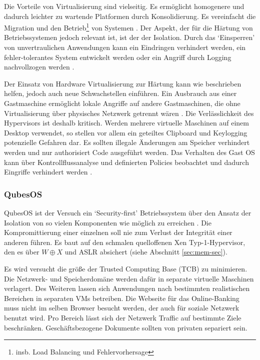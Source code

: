 Die Vorteile von Virtualisierung sind vielseitig. Es ermöglicht homogenere und dadurch leichter zu wartende Platformen durch Konsolidierung. Es vereinfacht die Migration und den Betrieb\footnote{insb. Load Balancing und Fehlervorhersage} von Systemen \cite{uhlig-intel}. Der Aspekt, der für die Härtung von Betriebssystemen jedoch relevant ist, ist der der Isolation. Durch das `Einsperren' von unvertraulichen Anwendungen kann ein Eindringen verhindert werden, ein fehler-tolerantes System
entwickelt werden \cite{terra} oder ein Angriff durch Logging nachvollzogen werden \cite{revirt}.

Der Einsatz von Hardware Virtualisierung zur Härtung kann wie beschrieben helfen, jedoch auch neue Schwachstellen einführen.
Ein Ausbrauch aus einer Gastmaschine ermöglicht lokale Angriffe auf andere Gastmaschinen, die ohne Virtualisierung über physisches Netzwerk getrennt wären \cite{svirt}. Die Verlässlichkeit des Hypervisors ist deshalb kritisch.
Werden mehrere virtuelle Maschinen auf einem Desktop verwendet, so stellen vor allem ein geteiltes Clipboard und Keylogging potenzielle Gefahren dar. 
Es sollten illegale Änderungen am Speicher verhindert werden und nur authorisiert Code ausgeführt werden. Das Verhalten des Gast OS kann über Kontrollflussanalyse und definierten Policies beobachtet und dadurch Eingriffe verhindert werden \cite{christo}.

\subsubsection{QubesOS}

QubesOS ist der Versuch ein `Security-first' Betriebssystem über den Ansatz der Isolation von so vielen Komponenten wie möglich zu erreichen \cite{qubes}. Die Kompromittierung einer einzelnen soll nie zum Verlust der Integrität einer anderen führen.
Es baut auf den schmalen quelloffenen Xen Typ-1-Hypervisor, den es über $W \oplus X$ und ASLR absichert (siehe Abschnitt \ref{sec:mem-sec}).

Es wird versucht die größe der Trusted Computing Base (TCB) zu minimieren. Die Netzwerk- und Speicherdomäne werden dafür in separate virtuelle Maschinen verlagert. Des Weiteren lassen sich Anwendungen nach bestimmten realistischen
Bereichen in separaten VMs betreiben. Die Webseite für das Online-Banking muss nicht im selben Browser besucht werden, der auch für soziale Netzwerk benutzt wird. Pro Bereich lässt sich der Netzwerk Traffic auf bestimmte Ziele beschränken. Geschäftsbezogene Dokumente sollten von privaten separiert sein.

